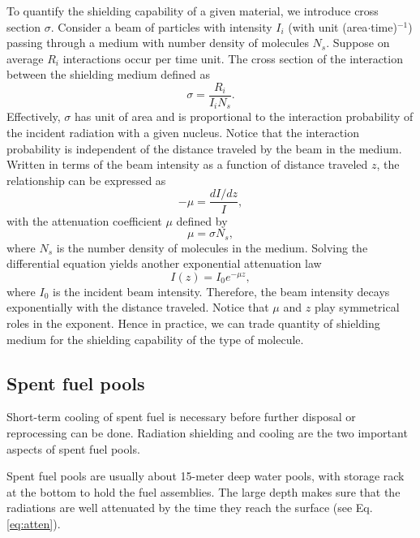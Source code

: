\documentclass[nofootinbib,preprint,aps]{revtex4-1}
\begin{document}
    To quantify the shielding capability of a given material, we introduce cross section $\sigma$. Consider
    a beam of particles with intensity $I_i$ (with unit (area$\cdot$time)${}^{-1}$) passing through a medium
    with number density of molecules $N_s$. Suppose on average $R_i$ interactions occur per time unit.
    The cross section of the interaction between the shielding medium defined as
    \begin{equation}
        \sigma = \frac{R_i}{I_i N_s}.
    \end{equation}
    Effectively, $\sigma$ has unit of area and
    is proportional to the interaction probability of the incident radiation with a given nucleus.\cite{k88}
    Notice that the interaction probability is independent of the distance traveled by the beam in
    the medium. Written in terms of the beam intensity as a function of distance traveled $z$,
    the relationship can be expressed as
    \begin{equation}
        -\mu = \frac{d I/dz}{I},
    \end{equation}
    with the attenuation coefficient $\mu$ defined by
    \begin{equation}
        \mu = \sigma N_s,
    \end{equation}
    where $N_s$ is the number density of molecules in the medium.
    Solving the differential
    equation yields another exponential attenuation law
    \begin{equation}
        \label{eq:atten}
        I(z) = I_0 e^{-\mu z},
    \end{equation}
    where $I_0$ is the incident beam intensity. Therefore, the beam intensity decays exponentially
    with the distance traveled. Notice that $\mu$ and $z$ play symmetrical roles in the exponent. Hence
    in practice, we can trade quantity of shielding medium for the shielding capability of the type of
    molecule.

    \subsection{Spent fuel pools}
    Short-term cooling of spent fuel is necessary before further disposal or reprocessing can be done.
    Radiation shielding and cooling are the two important aspects of spent fuel pools.

    Spent fuel pools  are usually about 15-meter deep water pools,
    with storage rack at the bottom to hold the fuel assemblies. The large depth makes sure that the radiations
    are well attenuated by the time they reach the surface (see Eq.\ref{eq:atten}).
\end{document}
